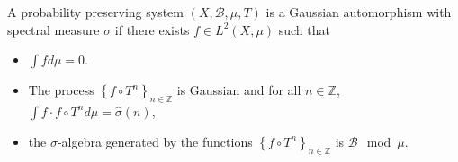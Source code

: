 \documentclass[12pt,reqno]{amsart}
\newcommand{\Z}{\mathbb{Z}}
\newcommand{\R}{\mathbb{R}}
\newcommand{\B}{\mathcal{B}}
\theoremstyle{definition}
\begin{document}
A probability preserving system $(X,\B,\mu,T)$ is a Gaussian automorphism with spectral measure $\sigma$ if there exists $f\in L^2(X,\mu)$ such that
\begin{itemize}
\item $\int fd\mu=0$. 
\item The process $\left\{f\circ T^n\right\}_{n\in\Z}$ is Gaussian and for all $n\in\Z$, $\int f \cdot f\circ T^nd\mu=\hat{\sigma}(n)$,
\item the  
 $\sigma$-algebra generated by the functions $\left\{f\circ T^n\right\}_{n\in\Z}$ is $\B \mod \mu$. 
\end{itemize}
\end{document}
